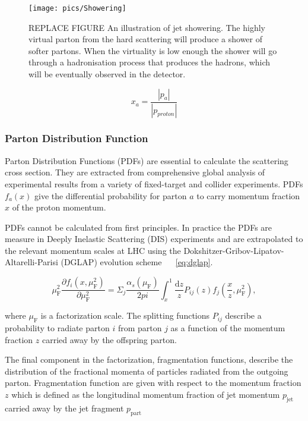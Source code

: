 \begin{figure}
\centering
\texttt{[image: pics/Showering]}
\caption[Jet showering]{REPLACE FIGURE An illustration of jet showering. The highly virtual parton from the hard scattering will produce a shower of softer partons. When the virtuality is low enough the shower will go through a hadronisation process that produces the hadrons, which will be eventually observed in the detector. }
\label{fig:highpt}
\end{figure}

$$x_a = \frac{\left| p_a \right|}{\left| p_{proton} \right|}$$


\subsubsection*{Parton Distribution Function}
Parton Distribution Functions (PDFs) are essential to calculate the scattering cross section. They are extracted from comprehensive global analysis of experimental results from a variety of fixed-target and collider experiments. PDFs $f_a\left(x\right)$ give the differential probability for parton $a$ to carry momentum fraction $x$ of the proton momentum. 

PDFs cannot be calculated from first principles. In practice the PDFs are measure in Deeply Inelastic Scattering (DIS) experiments and are extrapolated to the relevant momentum scales at LHC using the Dokshitzer-Gribov-Lipatov-Altarelli-Parisi (DGLAP) evolution scheme ~\cite{DGLAP}  ~\ref{eq:dglap}.

\begin{equation}
\mu_\mathrm{F}^2 \frac{\partial f_i\left(x,\mu_{\mathrm{F}}^2 \right)}{\partial \mu_{\mathrm{F}}^2} = \Sigma_j \frac{\alpha_s\left(\mu_{\mathrm{F}}\right)}{2{pi}} \int _x^1 \frac{\mathrm{d}z}{z} P_{ij}(z) f_j\left(\frac{x}{z},\mu_{\mathrm{F}}^2\right),
\label{eq:dglap}
\end{equation}


where $\mu_{\mathrm{F}}$ is a factorization scale. The splitting functions $P_{ij}$ describe a probability to radiate parton $i$ from parton $j$ as a function of the momentum fraction $z$ carried away by the offspring parton. 

The final component in the factorization, fragmentation functions, describe the distribution of the fractional momenta of particles radiated from the outgoing parton. Fragmentation function are given with respect to the momentum fraction $z$ which is defined as the longitudinal momentum fraction of jet momentum $p_{\mathrm{jet}}$ carried away by the jet fragment $p_{\mathrm{part}}$


